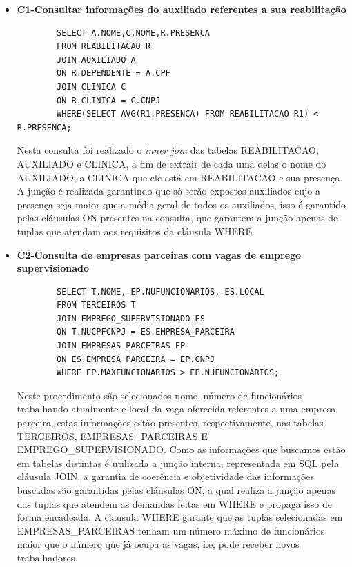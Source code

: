 \begin{itemize}
    \item \textbf{C1-Consultar informações do auxiliado referentes a sua reabilitação}
    
    \begin{lstlisting}
        SELECT A.NOME,C.NOME,R.PRESENCA 
        FROM REABILITACAO R 
        JOIN AUXILIADO A 
        ON R.DEPENDENTE = A.CPF 
        JOIN CLINICA C 
        ON R.CLINICA = C.CNPJ 
        WHERE(SELECT AVG(R1.PRESENCA) FROM REABILITACAO R1) < R.PRESENCA;  
    \end{lstlisting}
    
    Nesta consulta foi realizado o \textit{inner join} das tabelas REABILITACAO, AUXILIADO e CLINICA, a fim de extrair de cada uma delas o nome do AUXILIADO, a CLINICA que ele está em REABILITACAO e sua presença. A junção é realizada garantindo que só serão expostos auxiliados cujo a presença seja maior que a média geral de todos os auxiliados, isso é garantido pelas cláusulas ON presentes na consulta, que garantem a junção apenas de tuplas que atendam aos requisitos da cláusula WHERE.

    \item \textbf{C2-Consulta de empresas parceiras com vagas de emprego supervisionado}

    \begin{lstlisting}
        SELECT T.NOME, EP.NUFUNCIONARIOS, ES.LOCAL
        FROM TERCEIROS T
        JOIN EMPREGO_SUPERVISIONADO ES
        ON T.NUCPFCNPJ = ES.EMPRESA_PARCEIRA
        JOIN EMPRESAS_PARCEIRAS EP
        ON ES.EMPRESA_PARCEIRA = EP.CNPJ
        WHERE EP.MAXFUNCIONARIOS > EP.NUFUNCIONARIOS;
    \end{lstlisting}

    Neste procedimento são selecionados nome, número de funcionários trabalhando atualmente e local da vaga oferecida referentes a uma empresa parceira, estas informações estão presentes, respectivamente, nas tabelas TERCEIROS, EMPRESAS\_PARCEIRAS E EMPREGO\_SUPERVISIONADO. Como as informações que buscamos estão em tabelas distintas é utilizada a junção interna, representada em SQL pela cláusula JOIN, a garantia de coerência e objetividade das informações buscadas são garantidas pelas cláusulas ON, a qual realiza a junção apenas das tuplas que atendem as demandas feitas em WHERE e propaga isso de forma encadeada. A clausula WHERE garante que as tuplas selecionadas em EMPRESAS\_PARCEIRAS tenham um número máximo de funcionários maior que o número que já ocupa as vagas, i.e, pode receber novos trabalhadores.


\end{itemize}
